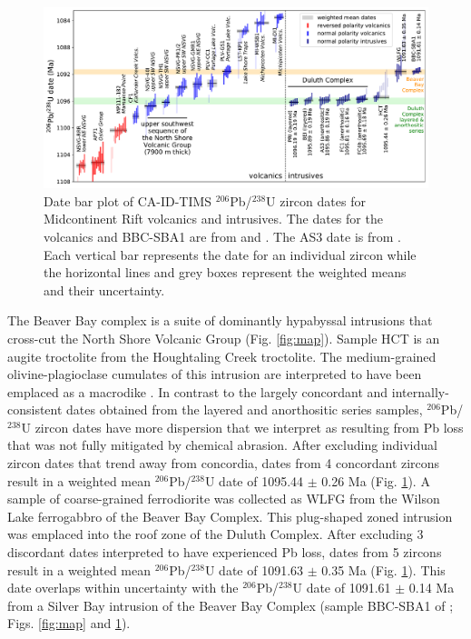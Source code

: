 \documentclass[11pt,letterpaper]{article}
\begin{document}
\begin{figure}[!ht]
\noindent\includegraphics[width=\textwidth]{./Figures/MCR_Dates.pdf}
\caption{\small{Date bar plot of CA-ID-TIMS $^{206}$Pb/$^{238}$U zircon dates for Midcontinent Rift volcanics and intrusives. The dates for the volcanics and BBC-SBA1 are from \cite{Fairchild2017a} and \cite{Swanson-Hysell2019a}. The AS3 date is from \cite{Schoene2006a}. Each vertical bar represents the date for an individual zircon while the horizontal lines and grey boxes represent the weighted means and their uncertainty.}}
\label{fig:dates}
\end{figure}

The Beaver Bay complex is a suite of dominantly hypabyssal intrusions that cross-cut the North Shore Volcanic Group (Fig. \ref{fig:map}). Sample HCT is an augite troctolite from the Houghtaling Creek troctolite. The medium-grained olivine-plagioclase cumulates of this intrusion are interpreted to have been emplaced as a macrodike \citep{Miller2001a}. In contrast to the largely concordant and internally-consistent dates obtained from the layered and anorthositic series samples, $^{206}$Pb/$^{238}$U zircon dates have more dispersion that we interpret as resulting from Pb loss that was not fully mitigated by chemical abrasion. After excluding individual zircon dates that trend away from concordia, dates from 4 concordant zircons result in a weighted mean $^{206}$Pb/$^{238}$U date of 1095.44 $\pm$ 0.26 Ma (Fig. \ref{fig:dates}). A sample of coarse-grained ferrodiorite was collected as WLFG from the Wilson Lake ferrogabbro of the Beaver Bay Complex. This plug-shaped zoned intrusion was emplaced into the roof zone of the Duluth Complex. After excluding 3 discordant dates interpreted to have experienced Pb loss, dates from 5 zircons result in a weighted mean $^{206}$Pb/$^{238}$U date of 1091.63 $\pm$ 0.35 Ma (Fig. \ref{fig:dates}). This date overlaps within uncertainty with the $^{206}$Pb/$^{238}$U date of 1091.61 $\pm$ 0.14 Ma from a Silver Bay intrusion of the Beaver Bay Complex (sample BBC-SBA1 of \citealp{Fairchild2017a}; Figs. \ref{fig:map} and \ref{fig:dates}).
\end{document}
